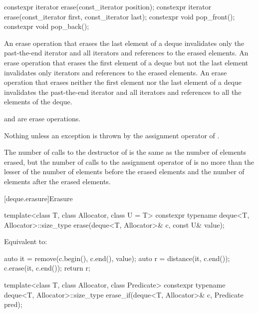 %
\begin{itemdecl}
constexpr iterator erase(const_iterator position);
constexpr iterator erase(const_iterator first, const_iterator last);
constexpr void pop_front();
constexpr void pop_back();
\end{itemdecl}

\begin{itemdescr}
\pnum
\effects
An erase operation that erases the last element of a deque invalidates only the past-the-end iterator
and all iterators and references to the erased elements. An erase operation that erases the first
element of a deque but not the last element invalidates only iterators
and references to the erased elements. An erase operation
that erases neither the first element nor the last element of a deque invalidates the past-the-end
iterator and all iterators and references to all the elements of the deque.
\begin{note}
 and  are erase operations.
\end{note}

\pnum
\throws
Nothing unless an exception is thrown by the assignment operator of
.

\pnum
\complexity
The number of calls to the destructor of  is the same as the
number of elements erased, but the number of calls to the assignment operator of  is
no more than the lesser of the number of elements before the erased elements and the number of elements after the erased elements.
\end{itemdescr}

[deque.erasure]{Erasure}

%
\begin{itemdecl}
template<class T, class Allocator, class U = T>
  constexpr typename deque<T, Allocator>::size_type
    erase(deque<T, Allocator>& c, const U& value);
\end{itemdecl}

\begin{itemdescr}
\pnum
\effects
Equivalent to:
\begin{codeblock}
auto it = remove(c.begin(), c.end(), value);
auto r = distance(it, c.end());
c.erase(it, c.end());
return r;
\end{codeblock}
\end{itemdescr}

%
\begin{itemdecl}
template<class T, class Allocator, class Predicate>
  constexpr typename deque<T, Allocator>::size_type
    erase_if(deque<T, Allocator>& c, Predicate pred);
\end{itemdecl}

